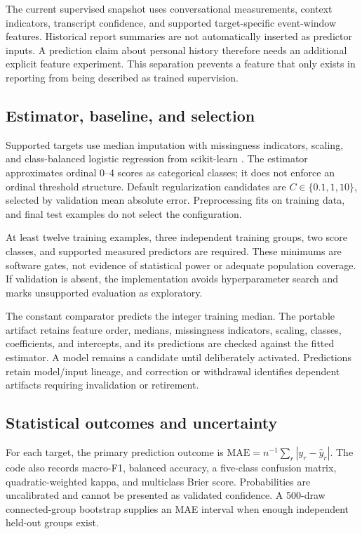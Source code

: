 \documentclass{article}
\begin{document}
The current supervised snapshot uses conversational measurements, context indicators, transcript confidence, and supported target-specific event-window features. Historical report summaries are not automatically inserted as predictor inputs. A prediction claim about personal history therefore needs an additional explicit feature experiment. This separation prevents a feature that only exists in reporting from being described as trained supervision.

\subsection{Estimator, baseline, and selection}
Supported targets use median imputation with missingness indicators, scaling, and class-balanced logistic regression from scikit-learn \cite{pedregosa2011}. The estimator approximates ordinal 0--4 scores as categorical classes; it does not enforce an ordinal threshold structure. Default regularization candidates are $C\in\{0.1,1,10\}$, selected by validation mean absolute error. Preprocessing fits on training data, and final test examples do not select the configuration.

At least twelve training examples, three independent training groups, two score classes, and supported measured predictors are required. These minimums are software gates, not evidence of statistical power or adequate population coverage. If validation is absent, the implementation avoids hyperparameter search and marks unsupported evaluation as exploratory.

The constant comparator predicts the integer training median. The portable artifact retains feature order, medians, missingness indicators, scaling, classes, coefficients, and intercepts, and its predictions are checked against the fitted estimator. A model remains a candidate until deliberately activated. Predictions retain model/input lineage, and correction or withdrawal identifies dependent artifacts requiring invalidation or retirement.

\subsection{Statistical outcomes and uncertainty}
For each target, the primary prediction outcome is $\mathrm{MAE}=n^{-1}\sum_r|y_r-\widehat y_r|$. The code also records macro-F1, balanced accuracy, a five-class confusion matrix, quadratic-weighted kappa, and multiclass Brier score. Probabilities are uncalibrated and cannot be presented as validated confidence. A 500-draw connected-group bootstrap supplies an MAE interval when enough independent held-out groups exist.
\end{document}

